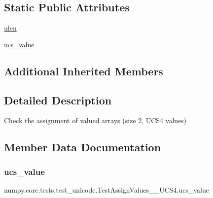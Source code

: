 \subsection*{Static Public Attributes}
\begin{DoxyCompactItemize}
\item 
\hyperlink{classnumpy_1_1core_1_1tests_1_1test__unicode_1_1TestAssignValues__2__UCS4_a04a9de418ef09ea761e87e5cc0a7a6e6}{ulen}
\item 
\hyperlink{classnumpy_1_1core_1_1tests_1_1test__unicode_1_1TestAssignValues__2__UCS4_acb0302ba5a14454e5867a245734c494b}{ucs\+\_\+value}
\end{DoxyCompactItemize}
\subsection*{Additional Inherited Members}


\subsection{Detailed Description}
\begin{DoxyVerb}Check the assignment of valued arrays (size 2, UCS4 values)\end{DoxyVerb}
 

\subsection{Member Data Documentation}
\mbox{\label{classnumpy_1_1core_1_1tests_1_1test__unicode_1_1TestAssignValues__2__UCS4_acb0302ba5a14454e5867a245734c494b}} 
\subsubsection{\texorpdfstring{ucs\+\_\+value}{ucs\_value}}
{\footnotesize\ttfamily numpy.\+core.\+tests.\+test\+\_\+unicode.\+Test\+Assign\+Values\+\_\+\_\+\+U\+C\+S4.\+ucs\+\_\+value\hspace{0.3cm}{\ttfamily [static]}}


